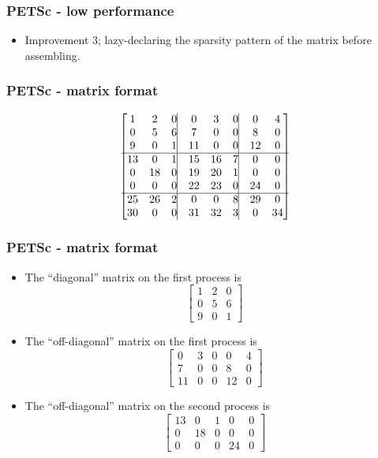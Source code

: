 \documentclass{beamer}
\begin{document}
\begin{frame}\frametitle{PETSc - low performance}
  \begin{itemize}
    \item Improvement 3; lazy-declaring the sparsity pattern of the matrix 
          before assembling.
    
  \end{itemize}
\end{frame}
\begin{frame}\frametitle{PETSc - matrix format}
  \[
    \begin{bmatrix}
         1 &  2 &  0 \vline &  0 &  3 &  0 \vline & 0 &  4 \\
         0 &  5 &  6 \vline &  7 &  0 &  0 \vline &  8 &  0 \\
         9 &  0 &  1 \vline & 11 &  0 &  0 \vline & 12 &  0 \\
         \hline
        13 &  0 &  1 \vline & 15 & 16 &  7 \vline  &  0 &  0 \\
         0 & 18 &  0 \vline & 19 & 20 &  1 \vline &  0 &  0 \\
         0 &  0 &  0 \vline & 22 & 23 &  0 \vline & 24 &  0 \\
         \hline
        25 & 26 &  2 \vline &  0 &  0 &  8 \vline & 29 &  0 \\
        30 &  0 &  0 \vline & 31 & 32 &  3 \vline &  0 & 34
    \end{bmatrix}
  \]
\end{frame}
\begin{frame}\frametitle{PETSc - matrix format}
  \begin{itemize}
    \item The ``diagonal'' matrix on the first process is
        \[
          \begin{bmatrix}
                1 & 2 & 0 \\
                0 & 5 & 6 \\
                9 & 0 & 1
          \end{bmatrix}
        \]
    \item The ``off-diagonal'' matrix on the first process is
        \[
          \begin{bmatrix}
            0  & 3 & 0 &  0 & 4 \\
            7  & 0 & 0 &  8 & 0 \\
            11 & 0 & 0 & 12 & 0
          \end{bmatrix}
        \]
    \item The ``off-diagonal'' matrix on the second process is
        \[
          \begin{bmatrix}
            13 &  0 & 1 &  0 & 0 \\
             0 & 18 & 0 &  0 & 0 \\
             0 &  0 & 0 & 24 & 0
          \end{bmatrix}
        \]
  \end{itemize}
\end{frame}
\end{document}
